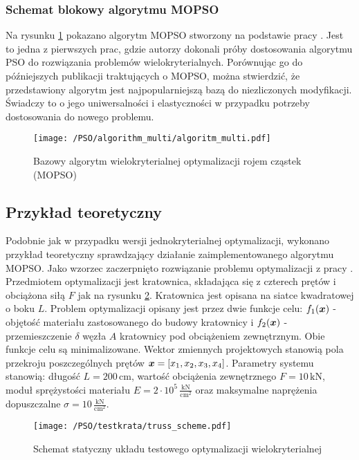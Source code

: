 \subsubsection{Schemat blokowy algorytmu MOPSO} \label{sect:MOPSO_algorithm}
Na rysunku \ref{fig: pso_multi_algorithm} pokazano algorytm MOPSO stworzony na podstawie pracy \parencite{CoelloCoello2002}. Jest to jedna z pierwszych prac, gdzie autorzy dokonali próby dostosowania algorytmu PSO do rozwiązania problemów wielokryterialnych. Porównując go do późniejszych publikacji traktujących o MOPSO, można stwierdzić, że przedstawiony algorytm jest najpopularniejszą bazą do niezliczonych modyfikacji. Świadczy to o jego uniwersalności i elastyczności w przypadku potrzeby dostosowania do nowego problemu.

\begin{figure}[p]
	\centering
	\texttt{[image: /PSO/algorithm\_multi/algoritm\_multi.pdf]}
	\captionsetup{justification=centering}
	\caption{Bazowy algorytm wielokryterialnej optymalizacji rojem cząstek (MOPSO)}
	\label{fig: pso_multi_algorithm}
\end{figure}

\clearpage

\subsection{Przykład teoretyczny}
Podobnie jak w przypadku wersji jednokryterialnej optymalizacji, wykonano przykład teoretyczny sprawdzający działanie zaimplementowanego algorytmu MOPSO. Jako wzorzec zaczerpnięto rozwiązanie problemu optymalizacji z pracy \parencite{Zavala2014}. Przedmiotem optymalizacji jest kratownica, składająca się z czterech prętów i obciążona siłą $F$ jak na rysunku \ref{fig: pso_multi_testtruss}. Kratownica jest opisana na siatce kwadratowej o boku $L$. Problem optymalizacji opisany jest przez dwie funkcje celu: $f_1(\bm{x})$ - objętość materiału zastosowanego do budowy kratownicy i $f_2(\bm{x})$ - przemieszczenie $\delta$ węzła $A$ kratownicy pod obciążeniem zewnętrznym. Obie funkcje celu są minimalizowane. Wektor zmiennych projektowych stanowią pola przekroju poszczególnych prętów $\bm{x}=[x_1,x_2,x_3,x_4]$. Parametry systemu stanowią: długość $L=200\,\text{cm}$, wartość obciążenia zewnętrznego $F=10\,\text{kN}$, moduł sprężystości materiału $E=2\cdot10^5\,\frac{\text{kN}}{\text{cm}^2}$ oraz maksymalne naprężenia dopuszczalne $\sigma=10\,\frac{\text{kN}}{\text{cm}^2}$.
\begin{figure}[hbt!]
	\centering
	\texttt{[image: /PSO/testkrata/truss\_scheme.pdf]} 
	\captionsetup{justification=centering}
	\caption{Schemat statyczny układu testowego optymalizacji wielokryterialnej}
	\label{fig: pso_multi_testtruss} 
\end{figure}




